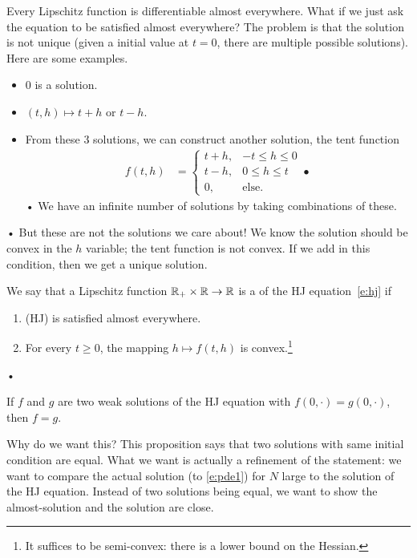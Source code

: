 Every Lipschitz function is differentiable almost everywhere. What if we just ask the equation to be satisfied almost everywhere?
The problem is that the solution is not unique (given a initial value at $t=0$, there are multiple possible solutions). Here are some examples.
\begin{itemize}
\item
0 is a solution.
\item
$(t,h)\mapsto t+h$ or $t-h$.
\item
From these 3 solutions, we can construct another solution, the tent function
\begin{align*}
f(t,h) &=\begin{cases}
t+h,&-t\le h\le 0\\
t-h,&0\le h\le t\\
0,&\text{else.}
\end{cases}•
\end{align*}•
We have an infinite number of solutions by taking combinations of these.
\end{itemize}•
But these are not the solutions we care about! We know the solution should be convex in the $h$ variable; the tent function is not convex. If we add in this condition, then we get a unique solution.
\begin{df}
We say that a Lipschitz function $\mathbb{R}_+\times \mathbb{R}\to \mathbb{R}$ is a  of the HJ equation~\eqref{e:hj} if
\begin{enumerate}
\item
(HJ) is satisfied almost everywhere.
\item
For every $t\ge 0$, the mapping $h\mapsto f(t,h)$ is convex.\footnote{It suffices to be semi-convex: there is a lower bound on the Hessian.}
\end{enumerate}•
\end{df}
\begin{pr}[Uniqueness]
If $f$ and $g$ are two weak solutions of the HJ equation with $f(0,\cdot)=g(0,\cdot)$, then $f=g$.
\end{pr}
Why do we want this?
This proposition says that two solutions with same initial condition are equal. What we want is actually a refinement of the statement: we want to compare the actual solution (to \eqref{e:pde1}) for $N$ large to the solution of the HJ equation.
Instead of two solutions being equal, we want to show the almost-solution and the solution are close. 

